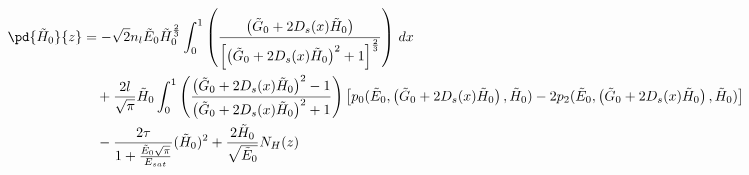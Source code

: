 \begin{equation}
\begin{split}
\pd{\tilde{H}_0}{z} &= - \sqrt{2}n_{l}\tilde{E}_0 \tilde{H}_0^{\frac{2}{3}} \int_{0}^{1} \left(\frac{\left(\tilde{G}_0+ 2 D_s(x) \tilde{H}_0\right)}{\left[\left(\tilde{G}_0+ 2 D_s(x) \tilde{H}_0\right)^2+1\right]^{\frac{2}{3}}}\right)\, dx  \\
&\quad + \frac{2l}{\sqrt{\pi}}\tilde{H}_0 \int_{0}^{1} \left(\frac{\left(\tilde{G}_0+ 2 D_s(x) \tilde{H}_0\right)^2-1}{\left(\tilde{G}_0+ 2 D_s(x) \tilde{H}_0\right)^2+1}\right) \left[p_0(\tilde{E}_0,\left(\tilde{G}_0+ 2 D_s(x) \tilde{H}_0\right),\tilde{H}_0) - 2p_2(\tilde{E}_0,\left(\tilde{G}_0+ 2 D_s(x) \tilde{H}_0\right),\tilde{H}_0)\right] \\
&\quad - \frac{2\tau}{1+\frac{\tilde{E}_0 \sqrt{\pi}}{E_{sat}}} (\tilde{H}_0)^2  + \frac{2\tilde{H}_0}{\sqrt{\tilde{E}_0}} N_H(z)\\
\end{split}
\end{equation}


